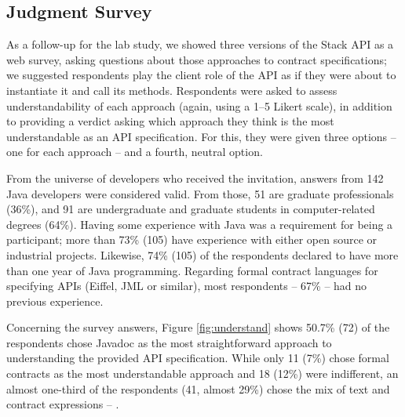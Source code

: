 \subsection{Judgment Survey}
\label{sec:surveyResults}

As a follow-up for the lab study, we showed three versions of the Stack API as a web survey, asking questions about those approaches to contract specifications; we suggested respondents play the client role of the API as if they were about to instantiate it and call its methods.
Respondents were asked to assess understandability of each approach (again, using a 1--5 Likert scale), in addition to providing a verdict asking which approach they think is the most understandable as an API specification. For this, they were given three options -- one for each approach -- and a fourth, neutral option.

From the universe of developers who received the invitation, answers from 142 Java developers were considered valid.
From those, 51 are graduate professionals (36\%), and 91 are undergraduate and graduate students in computer-related degrees (64\%).
Having some experience with Java was a requirement for being a participant; more than 73\% (105) have experience with either open source or industrial projects. Likewise, 74\% (105) of the respondents declared to have more than one year of Java programming.
Regarding formal contract languages for specifying APIs (Eiffel, JML or similar), most respondents -- 67\% -- had no previous experience. 


Concerning the survey answers, Figure \ref{fig:understand} shows 50.7\% (72) of the respondents chose Javadoc as the most straightforward approach to understanding the provided API specification. 
While only 11 (7\%) chose formal contracts as the most understandable approach and 18 (12\%) were indifferent, an almost one-third of the respondents (41, almost 29\%) chose the mix of text and contract expressions -- \contractjdoc{}.


